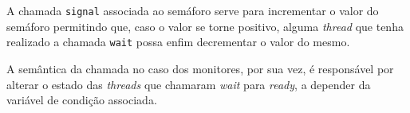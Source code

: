 \quest*{}%

\begin{answer}
    A chamada \texttt{signal} associada ao semáforo serve para incrementar o valor do semáforo permitindo que, caso o valor se torne positivo, alguma \textit{thread} que tenha realizado a chamada \texttt{wait} possa enfim decrementar o valor do mesmo.
    
    A semântica da chamada no caso dos monitores, por sua vez, é responsável por alterar o estado das \textit{threads} que chamaram \textit{wait} para \textit{ready}, a depender da variável de condição associada.
\end{answer}

\quest*{}%

\begin{answer}
    
\end{answer}